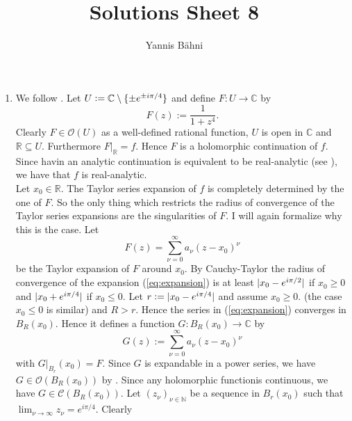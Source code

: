 

\title{Solutions Sheet 8}
\author{Yannis B\"{a}hni}
\address[Yannis B\"{a}hni]{University of Zurich, R\"{a}mistrasse 71, 8006 Zurich}


\maketitle
\thispagestyle{fancy}
\begin{enumerate}[label = \textbf{Exercise \arabic*.},wide = 0pt, itemsep=1.5ex]
	\item We follow \cite[99--101]{fischer2003funktionentheorie}. Let $U := \mathbb{C} \setminus \cbr[0]{\pm e^{\pm i\pi/4}}$ and define $F: U \to \mathbb{C}$ by
		\begin{equation}
			F(z) := \frac{1}{1 + z^4}.	
		\end{equation}
		Clearly $F \in \mathcal{O}(U)$ as a well-defined rational function, $U$ is open in $\mathbb{C}$ and $\mathbb{R} \subseteq U$. Furthermore $F\vert_\mathbb{R} = f$. Hence $F$ is a holomorphic continuation of $f$. Since havin an analytic continuation is equivalent to be real-analytic (see \cite[100]{fischer2003funktionentheorie}), we have that $f$ is real-analytic.\\
		Let $x_0 \in \mathbb{R}$. The Taylor series expansion of $f$ is completely determined by the one of $F$. So the only thing which restricts the radius of convergence of the Taylor series expansions are the singularities of $F$. I will again formalize why this is the case. Let 
		\begin{equation}
			F(z) = \sum_{\nu = 0}^\infty a_\nu(z - x_0)^\nu
			\label{eq:expansion}
		\end{equation}
		\noindent be the Taylor expansion of $F$ around $x_0$. By Cauchy-Taylor the radius of convergence of the expansion (\ref{eq:expansion}) is at least $\abs[0]{x_0 - e^{i\pi/2}}$ if $x_0 \geq 0$ and $\abs[0]{x_0 + e^{i\pi/4}}$ if $x_0 \leq 0$. Let $r:= \abs[0]{x_0 - e^{i\pi/4}}$ and assume $x_0 \geq 0$. (the case $x_0 \leq 0$ is similar) and $R > r$. Hence the series in (\ref{eq:expansion}) converges in $B_R(x_0)$. Hence it defines a function $G: B_R(x_0) \to \mathbb{C}$ by
		\begin{equation}
			G(z) := \sum_{\nu = 0}^\infty a_\nu(z - x_0)^\nu 
		\end{equation}
		\noindent with $G\vert_{B_r}(x_0) = F$. Since $G$ is expandable in a power series, we have $G \in \mathcal{O}(B_R(x_0))$ by \cite[187]{remmert2002funktionentheorie}. Since any holomorphic functionis continuous, we have $G \in \mathscr{C}(B_R(x_0))$. Let $(z_\nu)_{\nu \in \mathbb{N}}$ be a sequence in $B_r(x_0)$ such that $\lim_{\nu \to \infty} z_\nu = e^{i\pi/4}$. Clearly

\end{enumerate}

